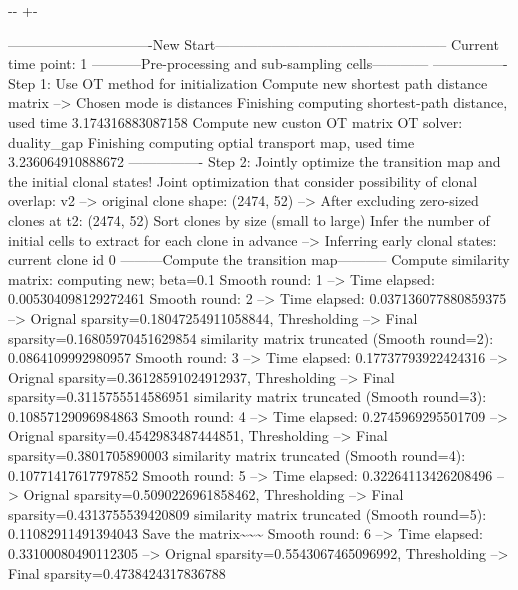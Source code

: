 \documentclass[letterpaper,10pt,english]{sphinxmanual}
\newlength\nbsphinxcodecellspacing
\begin{document}
{

\kern-\sphinxverbatimsmallskipamount\kern-\baselineskip
\kern+\FrameHeightAdjust\kern-\fboxrule
\vspace{\nbsphinxcodecellspacing}

\begin{sphinxVerbatim}[commandchars=\\\{\}]
-------------------------------New Start--------------------------------------------------
Current time point: 1
-----------Pre-processing and sub-sampling cells------------
----------------
Step 1: Use OT method for initialization
Compute new shortest path distance matrix
--> Chosen mode is distances
Finishing computing shortest-path distance, used time 3.174316883087158
Compute new custon OT matrix
OT solver: duality\_gap
Finishing computing optial transport map, used time 3.236064910888672
----------------
Step 2: Jointly optimize the transition map and the initial clonal states!
Joint optimization that consider possibility of clonal overlap: v2
--> original clone shape: (2474, 52)
--> After excluding zero-sized clones at t2: (2474, 52)
Sort clones by size (small to large)
Infer the number of initial cells to extract for each clone in advance
--> Inferring early clonal states: current clone id 0
---------Compute the transition map-----------
Compute similarity matrix: computing new; beta=0.1
Smooth round: 1
--> Time elapsed: 0.005304098129272461
Smooth round: 2
--> Time elapsed: 0.037136077880859375
--> Orignal sparsity=0.18047254911058844, Thresholding
--> Final sparsity=0.16805970451629854
similarity matrix truncated (Smooth round=2):  0.0864109992980957
Smooth round: 3
--> Time elapsed: 0.17737793922424316
--> Orignal sparsity=0.36128591024912937, Thresholding
--> Final sparsity=0.3115755514586951
similarity matrix truncated (Smooth round=3):  0.10857129096984863
Smooth round: 4
--> Time elapsed: 0.2745969295501709
--> Orignal sparsity=0.4542983487444851, Thresholding
--> Final sparsity=0.3801705890003
similarity matrix truncated (Smooth round=4):  0.10771417617797852
Smooth round: 5
--> Time elapsed: 0.32264113426208496
--> Orignal sparsity=0.5090226961858462, Thresholding
--> Final sparsity=0.4313755539420809
similarity matrix truncated (Smooth round=5):  0.11082911491394043
Save the matrix\textasciitilde{}\textasciitilde{}\textasciitilde{}
Smooth round: 6
--> Time elapsed: 0.33100080490112305
--> Orignal sparsity=0.5543067465096992, Thresholding
--> Final sparsity=0.4738424317836788

\end{sphinxVerbatim}}
\end{document}
